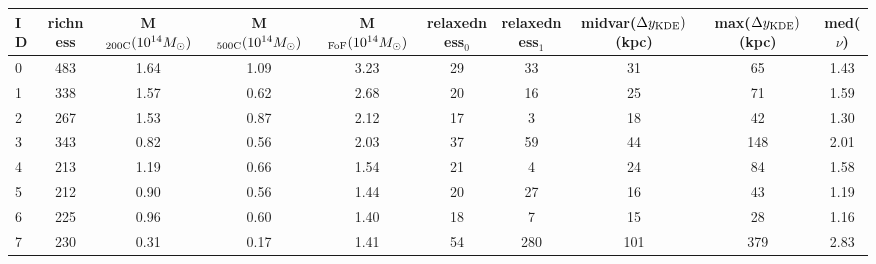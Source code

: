 \begin{tabular}{lccccccccc}
\toprule
ID & richness & M$_{\rm 200C} (10^{14} M_\odot)$ & M$_{\rm 500C} (10^{14} M_\odot)$ & M$_{\rm FoF} (10^{14} M_\odot)$  & relaxedness$_0$ & relaxedness$_1$ & midvar($\Delta y_{\rm KDE})$ (kpc) & max($\Delta y_{\rm KDE})$ (kpc) & med($\nu$) \\
\midrule
 0 &      483 &                             1.64 &                             1.09 &                             3.23 &              29 &              33 &                                 31 &                              65 &       1.43 \\
 1 &      338 &                             1.57 &                             0.62 &                             2.68 &              20 &              16 &                                 25 &                              71 &       1.59 \\
 2 &      267 &                             1.53 &                             0.87 &                             2.12 &              17 &               3 &                                 18 &                              42 &       1.30 \\
 3 &      343 &                             0.82 &                             0.56 &                             2.03 &              37 &              59 &                                 44 &                             148 &       2.01 \\
 4 &      213 &                             1.19 &                             0.66 &                             1.54 &              21 &               4 &                                 24 &                              84 &       1.58 \\
 5 &      212 &                             0.90 &                             0.56 &                             1.44 &              20 &              27 &                                 16 &                              43 &       1.19 \\
 6 &      225 &                             0.96 &                             0.60 &                             1.40 &              18 &               7 &                                 15 &                              28 &       1.16 \\
 7 &      230 &                             0.31 &                             0.17 &                             1.41 &              54 &             280 &                                101 &                             379 &       2.83 \\

\end{tabular}

